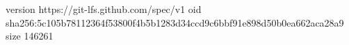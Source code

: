 version https://git-lfs.github.com/spec/v1
oid sha256:5c105b78112364f53800f4b5b1283d34ccd9c6bbf91e898d50b0ea662aca28a9
size 146261
